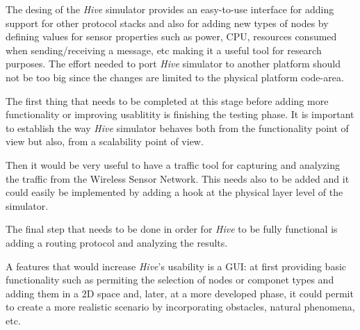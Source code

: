 
The desing of the \textit{Hive} simulator provides an easy-to-use interface
for adding support for other protocol stacks and also for adding new types of
nodes by defining values for sensor properties such as power, CPU, resources
consumed when sending/receiving a message, etc making it a useful tool for
research purposes.
The effort needed to port \textit{Hive} simulator to another platform should
not be too big since the changes are limited to the physical platform
code-area.

The first thing that needs to be completed at this stage before adding more
functionality or improving usablitity is finishing the testing phase. It is
important to establish the way \textit{Hive} simulator behaves both from the
functionality point of view but also, from a scalability point of view.

Then it would be very useful to have a traffic tool for capturing and
analyzing the traffic from the Wireless Sensor Network. This needs also to be
added and it could easily be implemented by adding a hook at
the physical layer level of the simulator.

The final step that needs to be done in order for \textit{Hive} to be fully
functional is adding a routing protocol and analyzing the results.

A features that would increase \textit{Hive}'s usability is a GUI: at first
providing basic functionality such as permiting the selection of nodes
or componet types and adding them in a 2D space and, later, at a more developed phase, it could
permit to create a more realistic scenario by incorporating obstacles, natural
phenomena, etc.  
